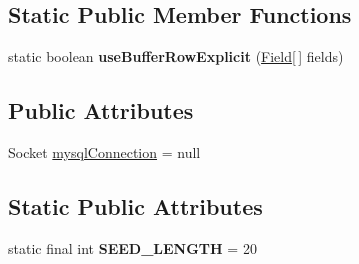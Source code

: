 \subsection*{Static Public Member Functions}
\begin{DoxyCompactItemize}
\item 
\mbox{\label{classcom_1_1mysql_1_1jdbc_1_1_mysql_i_o_ad9f29b93a2437574e50ba8f85b77c8c3}} 
static boolean {\bfseries use\+Buffer\+Row\+Explicit} (\mbox{\hyperlink{classcom_1_1mysql_1_1jdbc_1_1_field}{Field}}\mbox{[}$\,$\mbox{]} fields)
\end{DoxyCompactItemize}
\subsection*{Public Attributes}
\begin{DoxyCompactItemize}
\item 
Socket \mbox{\hyperlink{classcom_1_1mysql_1_1jdbc_1_1_mysql_i_o_a4e4146e633ac294fc4e60b7168f346e3}{mysql\+Connection}} = null
\end{DoxyCompactItemize}
\subsection*{Static Public Attributes}
\begin{DoxyCompactItemize}
\item 
\mbox{\label{classcom_1_1mysql_1_1jdbc_1_1_mysql_i_o_a990a37f80033c522373acc3df21487a4}} 
static final int {\bfseries S\+E\+E\+D\+\_\+\+L\+E\+N\+G\+TH} = 20
\end{DoxyCompactItemize}
